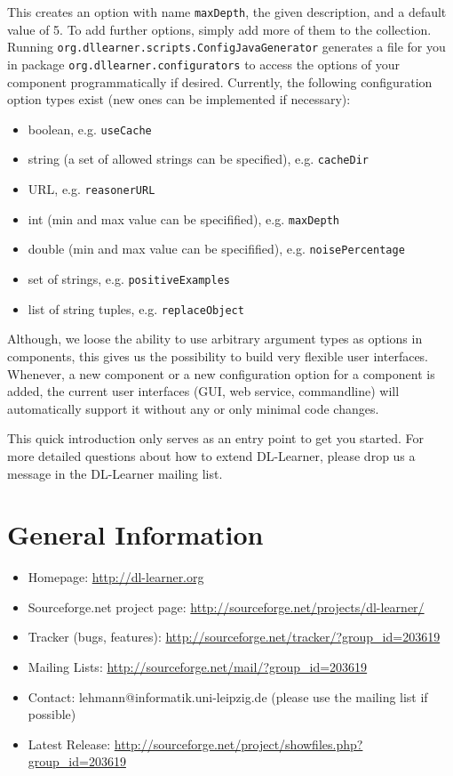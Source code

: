 \documentclass[a4paper,12pt]{scrartcl}
\begin{document}
This creates an option with name \verb|maxDepth|, the given description, and a default value of 5. To add further options, simply add more of them to the collection. Running \verb|org.dllearner.scripts.ConfigJavaGenerator| generates a file for you in package \verb|org.dllearner.configurators| to access the options of your component programmatically if desired. Currently, the following configuration option types exist (new ones can be implemented if necessary):

\begin{itemize}
 \item boolean, e.g. \verb|useCache|
 \item string (a set of allowed strings can be specified), e.g. \verb|cacheDir|
 \item URL, e.g. \verb|reasonerURL|
 \item int (min and max value can be specifified), e.g. \verb|maxDepth|
 \item double (min and max value can be specifified), e.g. \verb|noisePercentage|
 \item set of strings, e.g. \verb|positiveExamples|
 \item list of string tuples, e.g. \verb|replaceObject|
\end{itemize}

Although, we loose the ability to use arbitrary argument types as options in components, this gives us the possibility to build very flexible user interfaces. Whenever, a new component or a new configuration option for a component is added, the current user interfaces (GUI, web service, commandline) will automatically support it without any or only minimal code changes.

This quick introduction only serves as an entry point to get you started. For more detailed questions about how to extend DL-Learner, please drop us a message in the DL-Learner mailing list.

\section{General Information}
\label{sec:general}
\label{sec:contact}

\begin{itemize}
 \item Homepage: \url{http://dl-learner.org}
 \item Sourceforge.net project page: \url{http://sourceforge.net/projects/dl-learner/}
 \item Tracker (bugs, features): \url{http://sourceforge.net/tracker/?group_id=203619}
 \item Mailing Lists: \url{http://sourceforge.net/mail/?group_id=203619}
 \item Contact: lehmann@informatik.uni-leipzig.de (please use the mailing list if possible)
 \item Latest Release: \url{http://sourceforge.net/project/showfiles.php?group_id=203619}
\end{itemize}



\end{document}
